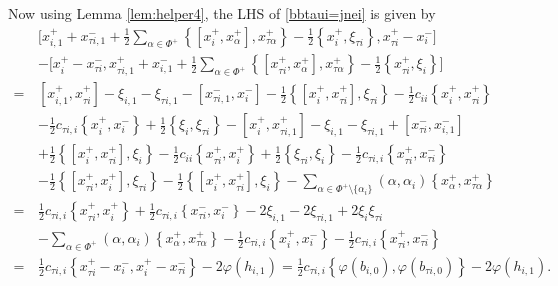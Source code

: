 \documentclass[11pt,reqno]{amsart}
\numberwithin{equation}{section}
\theoremstyle{definition}
\theoremstyle{remark}
\newcommand{\hf}{\tfrac12}
\begin{document}
Now using Lemma \ref{lem:helper4}, the LHS of \eqref{bbtaui=jnei} is given by
\begin{align*}
&\Big[
x_{i,1}^{+}+x_{\tau i,1}^{-}
+\hf\sum_{\alpha\in\Phi^+}
\left\{ [x_i^+,x_\alpha^+ ],x_{\tau\alpha}^+\right\}
-\hf\left\{x_i^+,\xi_{\tau i}\right\},
x_{\tau i}^+-x_i^-
\Big]                                      \\
&-
\Big[
x_i^+-x_{\tau i}^{-},
x_{\tau i,1}^{+}+x_{i,1}^{-}
+\hf \sum_{\alpha\in\Phi^+}
\left\{ [x_{\tau i}^+,x_\alpha^+ ],x_{\tau\alpha}^+\right\}
-\hf\left\{x_{\tau i}^+,\xi_i\right\}
\Big]                                      \\
=\,&
\left[x_{i,1}^+,x_{\tau i}^+\right]
-\xi_{i,1}-\xi_{\tau i,1}
-\left[x_{\tau i,1}^{-},x_i^{-}\right]
-\hf\left\{ [x_i^+,x_{\tau i}^+ ],\xi_{\tau i}\right\}-\hf c_{ii}
\left\{x_i^+,x_{\tau i}^+\right\} \\
& 
-\hf c_{\tau i,i}
\left\{x_i^+,x_i^-\right\}
+\hf\left\{\xi_i,\xi_{\tau i}\right\} -\left[x_i^+,x_{\tau i,1}^{+}\right] -\xi_{i,1}-\xi_{\tau i,1}+\left[x_{\tau i}^{-},x_{i,1}^{-}\right]   \\
&
+\hf\left\{ [x_i^+,x_{\tau i}^+ ],\xi_i\right\}-\hf c_{ii}
\left\{x_{\tau i}^+,x_i^+\right\}
+\hf\left\{\xi_{\tau i},\xi_i\right\}
-\hf c_{\tau i,i}
\left\{x_{\tau i}^+,x_{\tau i}^{-}\right\}
\\
&
-\hf\left\{ [x_{\tau i}^+,x_i^+ ],\xi_{\tau i}\right\}
-\hf\left\{ [x_i^+,x_{\tau i}^+ ],\xi_i\right\}-\sum_{\alpha\in\Phi^+\setminus\{\alpha_i\}}
(\alpha,\alpha_i)
\left\{x_\alpha^+,x_{\tau\alpha}^+\right\}\\
=\,&\hf c_{\tau i,i}\left\{x_{\tau i}^+,x_i^+\right\}+\hf c_{\tau i,i}\left\{x_{\tau i}^-,x_i^-\right\}-2\xi_{i,1}-2\xi_{\tau i,1}+2\xi_i\xi_{\tau i}\\
&-\sum_{\alpha\in\Phi^+}
(\alpha,\alpha_i)
\left\{x_\alpha^+,x_{\tau\alpha}^+\right\}-\hf c_{\tau i,i}\left\{x_{i}^+,x_i^-\right\}-\hf c_{\tau i,i}\left\{x_{\tau i}^+,x_{\tau i}^-\right\}\\
=\,&\hf c_{\tau i,i}\left\{x_{\tau i}^+-x_i^-,x_i^+-x_{\tau i}^-\right\}-2\varphi(h_{i,1})=\hf c_{\tau i,i}\left\{\varphi(b_{i,0}),\varphi(b_{\tau i,0})\right\}-2\varphi(h_{i,1}).
\end{align*}
\end{document}
